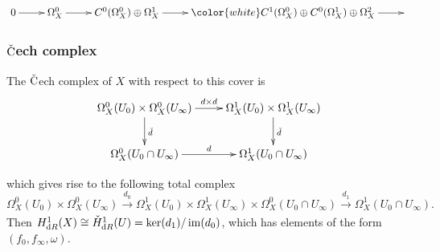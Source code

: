 \documentclass{beamer}
\begin{document}
\begin{frame}
{\begin{displaymath}
\xymatrix{
0 \ar[r]  & \Omega_X^0 \ar[r] & C^0(\Omega_X^0) \oplus \Omega_X^1  \ar@[white][r] & {\color{white} C^1(\Omega_X^0) \oplus C^0(\Omega_X^1) \oplus \Omega_X^2} \ar@[white][r] &
}
\end{displaymath}}

\end{frame}




\begin{frame}
\frametitle{$\check{\text C}$ech complex}
The $\check {\text C}$ech complex of $X$ with respect to this cover is
\begin{displaymath}
    \xymatrix{
        \Omega^0_X(U_0)\times \Omega_X^0(U_\infty) \ar[r]^{d \times d} \ar[d]^{\check d} & \Omega^1_X(U_0) \times \Omega_X^1(U_\infty) \ar[d]^{\check d} \\
        \Omega_X^0(U_0\cap U_\infty) \ar[r]^{d}                      & \Omega_X^1(U_0 \cap U_\infty)
    }
\end{displaymath}
\pause

which gives rise to the following total complex
\begin{equation*}
\Omega^0_X(U_0) \times \Omega_X^0(U_\infty) \xrightarrow[]{d_0} \Omega_X^1(U_0)\times \Omega_X^1(U_\infty) \times \Omega_X^0(U_0 \cap U_\infty) \xrightarrow[]{d_1} \Omega^1_X(U_0 \cap U_\infty).
\end{equation*}
\pause
Then $H^1_{\text dR}(X) \cong \check{H}^1_{\text dR}(U) = \operatorname{ker}(d_1)/\operatorname{im}(d_0)$, which has elements of the form $(f_0, f_\infty , \omega)$.
\end{frame}
\end{document}
